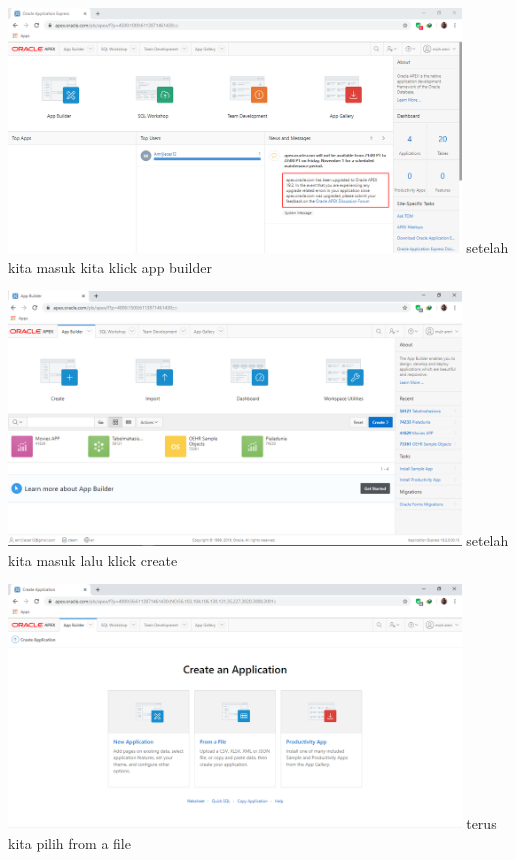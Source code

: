 \documentclass[12pt, times news roman, a4paper] {article}
\begin{document}
\begin{minipage}{\linewidth}
	\centering
	\includegraphics[width=12cm]{Gambar3.png} 
	 {setelah kita masuk kita klick app builder }
\end{minipage}

\begin{minipage}{\linewidth}
	\centering
	\includegraphics[width=12cm]{Gambar4.png} 
	 {setelah kita masuk lalu klick create }
\end{minipage}

\begin{minipage}{\linewidth}
	\centering
	\includegraphics[width=12cm]{Gambar5.png} 
	 {terus kita pilih from a file }
\end{minipage}
\end{document}
